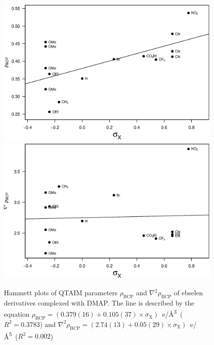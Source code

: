 \begin{refsection}
\begin{figure}
  \centering
  \includegraphics[width=0.9\linewidth]{Figures/hammett-rho-dmap.eps}
  \includegraphics[width=0.9\linewidth]{Figures/hammett-lapl-dmap.eps}
  \caption[Hammett plots of QTAIM parameters $\rho_\text{BCP}$ and $\nabla^2\rho_{\text{BCP}}$ of ebselen derivatives complexed with DMAP.]{Hammett plots of QTAIM parameters $\rho_\text{BCP}$ and $\nabla^2\rho_{\text{BCP}}$ of ebselen derivatives complexed with DMAP. The line is described by the equation $\rho_{\text{BCP}} = (0.379(16) + 0.105(37) \times \sigma_{\mathrm{X}})$~e/\AA\textsuperscript{3}~($R^2=0.3783$) and $\nabla^2\rho_{\text{BCP}} = (2.74(13) + 0.05(29) \times \sigma_{\mathrm{X}})$~e/\AA\textsuperscript{5}~($R^2=0.002$)}
  \label{fig:hammett-qtaim-dmap}
\end{figure}


\end{refsection}
